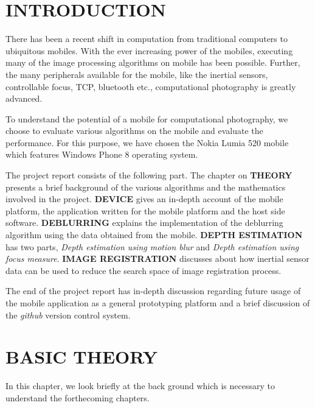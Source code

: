 \documentclass[BTech]{iitmdiss}
\begin{document}
\chapter{INTRODUCTION}
\label{chap:intro}
There has been a recent shift in computation from traditional computers
to ubiquitous mobiles. With the ever increasing power of the mobiles, 
executing many of the image processing algorithms on mobile has been 
possible. Further, the many peripherals available for the mobile, like
the inertial sensors, controllable focus, TCP, bluetooth etc., 
computational photography is greatly advanced. 

To understand the potential of a mobile for computational photography, 
we choose to evaluate various algorithms on the mobile and evaluate the 
performance. For this purpose, we have chosen the Nokia Lumia 520 mobile
which features Windows Phone 8 operating system. 

The project report consists of the following part. The chapter on 
\textbf{THEORY} presents a brief background of the various algorithms
and the mathematics involved in the project. \textbf{DEVICE} gives an
in-depth account of the mobile platform, the application written for the
mobile platform and the host side software. \textbf{DEBLURRING} 
explains the implementation of the deblurring algorithm using the data
obtained from the mobile. \textbf{DEPTH ESTIMATION} has two parts, 
\emph{Depth estimation using motion blur} and \emph{Depth estimation 
using focus measure}. \textbf{IMAGE REGISTRATION} discusses about how
inertial sensor data can be used to reduce the search space of image 
registration process. 

The end of the project report has in-depth discussion regarding future
usage of the mobile application as a general prototyping platform and a
brief discussion of the \emph{github} version control system.

\chapter{BASIC THEORY}
\label{chap:basic_theory}
In this chapter, we look briefly at the back ground which is necessary 
to understand the forthecoming chapters. 
\end{document}
